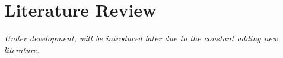 \chapter{Literature Review}\label{ch:literature_review}

\textit{Under development, will be introduced later due to the constant adding new literature}.
